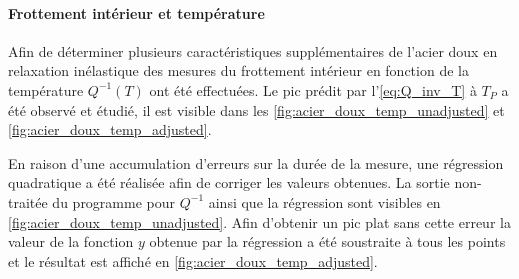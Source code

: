 \paragraph{Frottement intérieur et température} Afin de déterminer plusieurs caractéristiques supplémentaires de l'acier doux en relaxation inélastique des mesures du frottement intérieur en fonction de la température $Q^{-1}(T)$ ont été effectuées. Le pic prédit par l'\autoref{eq:Q_inv_T} à $T_P$ a été observé et étudié, il est visible dans les \autoref{fig:acier_doux_temp_unadjusted} et \autoref{fig:acier_doux_temp_adjusted}.

En raison d'une accumulation d'erreurs sur la durée de la mesure, une régression quadratique a été réalisée afin de corriger les valeurs obtenues. La sortie non-traitée du programme pour $Q^{-1}$ ainsi que la régression sont visibles en \autoref{fig:acier_doux_temp_unadjusted}. Afin d'obtenir un pic plat sans cette erreur la valeur de la fonction $y$ obtenue par la régression a été soustraite à tous les points et le résultat est affiché en \autoref{fig:acier_doux_temp_adjusted}.


